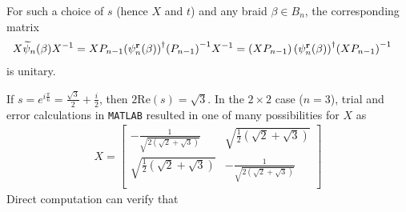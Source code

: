 For such a choice of $s$ (hence $X$ and $t$) and any braid $\beta\in B_n$, the corresponding matrix
\begin{align*}
    X\widetilde{\psi}_n(\beta){ X }^{-1} &= X P_{n-1}{\left(\psi_n^\mathbf{r}(\beta)\right)}^\dagger{ \left( P_{n-1} \right) }^{-1}{ X }^{-1} = \left( X P_{n-1} \right){\left(\psi_n^\mathbf{r}(\beta)\right)}^\dagger{ \left( X P_{n-1} \right) }^{-1}
\end{align*}
is unitary.

\begin{example}\label{ex:unitary}
    If $s=e^{i\frac{\pi}{6}}=\frac{\sqrt{3}}{2} + \frac{i}{2}$, then $2\textrm{Re}(s) = \sqrt{3}$. In the $2\times 2$ case ($n=3$), trial and error calculations in \texttt{MATLAB} resulted in one of many possibilities for $X$ as
    \begin{align*}
        X = \left[
            \begin{array}{cc}
            -\frac{1}{\sqrt{2 \left(\sqrt{2}+\sqrt{3}\right)}} & \sqrt{\frac{1}{2} \left(\sqrt{2}+\sqrt{3}\right)} \\
            \sqrt{\frac{1}{2} \left(\sqrt{2}+\sqrt{3}\right)} & -\frac{1}{\sqrt{2 \left(\sqrt{2}+\sqrt{3}\right)}} \\
            \end{array}
            \right]
    \end{align*}
    Direct computation can verify that
    \begin{align*}

\end{align*}
\end{example}
